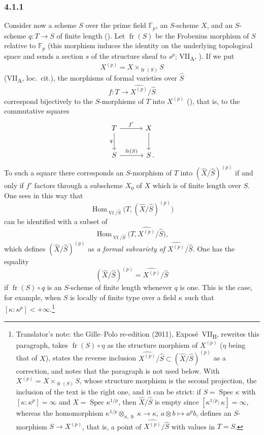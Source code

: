 
\subsubsection*{4.1.1}
\label{sga3:VIIB:4.1.1}

Consider now a scheme \(S\) over the prime field \(\mathbb F_p\), an
\(S\)-scheme \(X\), and an \(S\)-scheme \(q:T\to S\) of finite length
\textup{()}. Let \(\operatorname{fr}(S)\) be the Frobenius
morphism of \(S\) relative to \(\mathbb F_p\) \textup{(this morphism
induces the identity on the underlying topological space and sends a
section \(s\) of the structure sheaf to \(s^p\);
VII\textsubscript{A}, )}. If we put
\[
  X^{(p)}=X\times_{\operatorname{fr}(S)}S
\]
\textup{(VII\textsubscript{A}, loc.\ cit.)}, the morphisms of formal
varieties over \(\widehat S\)
\[
  f:T\longrightarrow\widehat{X^{(p)}}/\widehat S
\]
correspond bijectively to the \(S\)-morphisms of \(T\) into
\(X^{(p)}\) \textup{()}, that is, to the commutative squares
\[
  \begin{tikzcd}[row sep=2.4em,column sep=3.2em]
    T \arrow[r,"f'"] \arrow[d,"q"'] & X \arrow[d] \\
    S \arrow[r,"\operatorname{fr}(S)"] & S\rlap{\,.}
  \end{tikzcd}
\]
To such a square there corresponds an \(S\)-morphism of \(T\) into
\((\widehat X/\widehat S)^{(p)}\) if and only if \(f'\) factors
through a subscheme \(X_0\) of \(X\) which is of finite length over
\(S\). One sees in this way that
\[
  \operatorname{Hom}_{\operatorname{Vf}/\widehat S}
    \bigl(T,(\widehat X/\widehat S)^{(p)}\bigr)
\]
can be identified with a subset of
\[
  \operatorname{Hom}_{\operatorname{Vf}/\widehat S}
    \bigl(T,\widehat{X^{(p)}}/\widehat S\bigr),
\]
which defines \((\widehat X/\widehat S)^{(p)}\) as \emph{a formal
subvariety of} \(\widehat{X^{(p)}}/\widehat S\). One has the equality
\[
  (\widehat X/\widehat S)^{(p)}=\widehat{X^{(p)}}/\widehat S
\]
if \(\operatorname{fr}(S)\circ q\) is an \(S\)-scheme of finite
length whenever \(q\) is one. This is the case, for example, when \(S\)
is locally of finite type over a field \(\kappa\) such that
\([\kappa:\kappa^p]<+\infty\).\footnote{Translator's note: the Gille--Polo re-edition (2011), Expos\'e~VII\textsubscript{B}, rewrites this
paragraph, takes \(\operatorname{fr}(S)\circ\eta\) as the structure morphism of \(X^{(p)}\) (\(\eta\) being that
of \(X\)), states the reverse inclusion \(\widehat{X^{(p)}}/\widehat S\subset(\widehat X/\widehat S)^{(p)}\)
as a correction, and notes that the paragraph is not used below. With
\(X^{(p)}=X\times_{\operatorname{fr}(S)}S\), whose structure morphism is the second projection, the inclusion of
the text is the right one, and it can be strict: if \(S=\operatorname{Spec}\kappa\) with
\([\kappa:\kappa^p]=\infty\) and \(X=\operatorname{Spec}\kappa^{1/p}\), then \(\widehat X/\widehat S\) is empty
since \([\kappa^{1/p}:\kappa]=\infty\), whereas the homomorphism
\(\kappa^{1/p}\otimes_{\kappa,\operatorname{fr}}\kappa\to\kappa\), \(a\otimes b\mapsto a^pb\), defines an
\(S\)-morphism \(S\to X^{(p)}\), that is, a point of \(\widehat{X^{(p)}}/\widehat S\) with values in
\(T=S\).}
